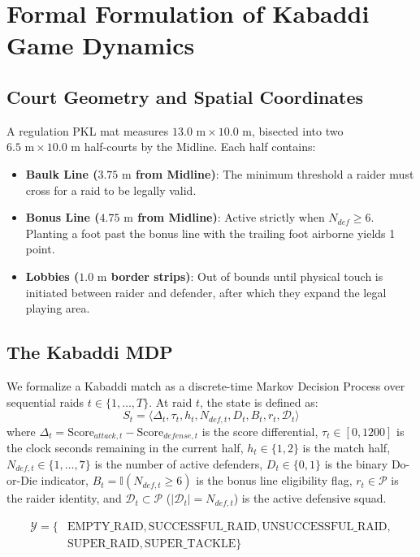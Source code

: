 \documentclass[11pt,a4paper]{article}
\begin{document}
\section{Formal Formulation of Kabaddi Game Dynamics}

\subsection{Court Geometry and Spatial Coordinates}
A regulation PKL mat measures $13.0\text{ m} \times 10.0\text{ m}$, bisected into two $6.5\text{ m} \times 10.0\text{ m}$ half-courts by the Midline. Each half contains:
\begin{itemize}
    \item \textbf{Baulk Line ($3.75\text{ m}$ from Midline)}: The minimum threshold a raider must cross for a raid to be legally valid.
    \item \textbf{Bonus Line ($4.75\text{ m}$ from Midline)}: Active strictly when $N_{def} \ge 6$. Planting a foot past the bonus line with the trailing foot airborne yields 1 point.
    \item \textbf{Lobbies ($1.0\text{ m}$ border strips)}: Out of bounds until physical touch is initiated between raider and defender, after which they expand the legal playing area.
\end{itemize}

\subsection{The Kabaddi MDP}
We formalize a Kabaddi match as a discrete-time Markov Decision Process over sequential raids $t \in \{1, \dots, T\}$. At raid $t$, the state is defined as:
\begin{equation}
S_t = \langle \Delta_t, \tau_t, h_t, N_{def, t}, D_t, B_t, r_t, \mathcal{D}_t \rangle
\end{equation}
where $\Delta_t = \text{Score}_{attack, t} - \text{Score}_{defense, t}$ is the score differential, $\tau_t \in [0, 1200]$ is the clock seconds remaining in the current half, $h_t \in \{1, 2\}$ is the match half, $N_{def, t} \in \{1, \dots, 7\}$ is the number of active defenders, $D_t \in \{0, 1\}$ is the binary Do-or-Die indicator, $B_t = \mathbb{I}(N_{def, t} \ge 6)$ is the bonus line eligibility flag, $r_t \in \mathcal{P}$ is the raider identity, and $\mathcal{D}_t \subset \mathcal{P}$ ($|\mathcal{D}_t| = N_{def, t}$) is the active defensive squad.

\begin{equation}
\begin{aligned}
\mathcal{Y} = \{ & \text{EMPTY\_RAID}, \text{SUCCESSFUL\_RAID}, \text{UNSUCCESSFUL\_RAID}, \\
& \text{SUPER\_RAID}, \text{SUPER\_TACKLE} \}
\end{aligned}
\end{equation}
\end{document}
